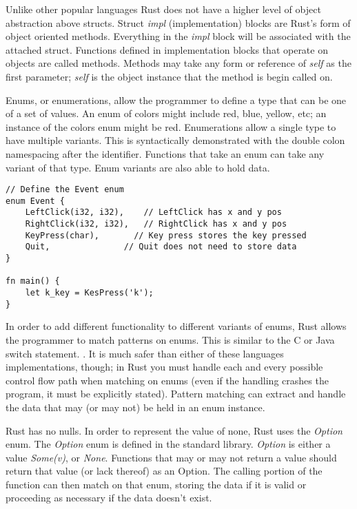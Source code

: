 \documentclass[12pt]{article}
\begin{document}
Unlike other popular languages Rust does not have a higher level of object
abstraction above structs. Struct \textit{impl} (implementation) blocks are
Rust's form of object oriented methods. Everything in the \textit{impl} block
will be associated with the attached struct. Functions defined in
implementation blocks that operate on objects are called methods. Methods may
take any form or reference of \textit{self} as the first parameter;
\textit{self} is the object instance that the method is begin called on.

Enums, or enumerations, allow the programmer to define a type that can be one
of a set of values. An enum of colors might include red, blue, yellow, etc; an
instance of the colors enum might be red. Enumerations allow a single type to
have multiple variants. This is syntactically demonstrated with the double
colon namespacing after the identifier. Functions that take an enum can take
any variant of that type. Enum variants are also able to hold data.

\singlespacing{}
\begin{verbatim}
// Define the Event enum
enum Event {
    LeftClick(i32, i32),    // LeftClick has x and y pos
    RightClick(i32, i32),   // RightClick has x and y pos
    KeyPress(char),       // Key press stores the key pressed
    Quit,               // Quit does not need to store data
}

fn main() {
    let k_key = KesPress('k');
}
\end{verbatim}
\doublespacing{}

In order to add different functionality to different variants of enums, Rust
allows the programmer to match patterns on enums. This is similar to the C or
Java switch statement. \textit{\cite{the-c-programming-language}}. It is much safer than
either of these languages implementations, though; in Rust you must handle each
and every possible control flow path when matching on enums (even if the
handling crashes the program, it must be explicitly stated). Pattern matching
can extract and handle the data that may (or may not) be held in an enum
instance.

Rust has no nulls. In order to represent the value of none, Rust uses the
\textit{Option} enum. The \textit{Option} enum is defined in the standard
library. \textit{Option} is either a value \textit{Some(v)}, or \textit{None}.
Functions that may or may not return a value should return that value (or lack
thereof) as an Option. The calling portion of the function can then match on
that enum, storing the data if it is valid or proceeding as necessary if the
data doesn't exist.
\end{document}
